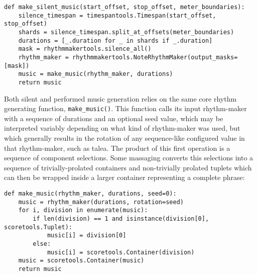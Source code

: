 \begin{abjadbookoutput}
\begin{singlespacing}
\vspace{-0.5\baselineskip}
\begin{verbatim}
def make_silent_music(start_offset, stop_offset, meter_boundaries):
    silence_timespan = timespantools.Timespan(start_offset, stop_offset)
    shards = silence_timespan.split_at_offsets(meter_boundaries)
    durations = [_.duration for _ in shards if _.duration]
    mask = rhythmmakertools.silence_all()
    rhythm_maker = rhythmmakertools.NoteRhythmMaker(output_masks=[mask])
    music = make_music(rhythm_maker, durations)
    return music
\end{verbatim}
\end{singlespacing}
\end{abjadbookoutput}

\noindent Both silent and performed music generation relies on the same core
rhythm generating function, \texttt{make\_music()}. This function calls its
input rhythm-maker with a sequence of durations and an optional seed value,
which may be interpreted variably depending on what kind of rhythm-maker was
used, but which generally results in the rotation of any sequence-like
configured value in that rhythm-maker, such as talea. The product of this first
operation is a sequence of component selections. Some massaging converts this
selections into a sequence of trivially-prolated containers and non-trivially
prolated tuplets which can then be wrapped inside a larger container
representing a complete phrase:

\begin{comment}
<abjadextract dissertation.py.time_tools:make_music />[strip_prompt]
\end{comment}

\begin{abjadbookoutput}
\begin{singlespacing}
\vspace{-0.5\baselineskip}
\begin{verbatim}
def make_music(rhythm_maker, durations, seed=0):
    music = rhythm_maker(durations, rotation=seed)
    for i, division in enumerate(music):
        if len(division) == 1 and isinstance(division[0], scoretools.Tuplet):
            music[i] = division[0]
        else:
            music[i] = scoretools.Container(division)
    music = scoretools.Container(music)
    return music
\end{verbatim}
\end{singlespacing}
\end{abjadbookoutput}

